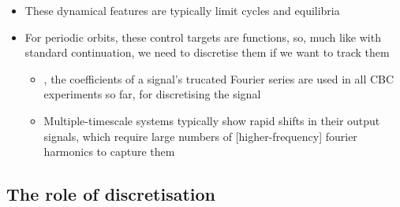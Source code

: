 \documentclass[11pt]{article}
\begin{document}
\begin{itemize}
\item These dynamical features are typically limit cycles and equilibria
\item For periodic orbits, these control targets are functions, so, much like with standard continuation, we need to discretise them if we want to track them
\begin{itemize}
\item{}, the coefficients of a signal's trucated Fourier series are used in all CBC experiments so far, for discretising the signal
\item Multiple-timescale systems typically show rapid shifts in their output signals, which require large numbers of [higher-frequency] fourier harmonics to capture them
\end{itemize}
\end{itemize}


\subsection{The role of discretisation}
\label{sec:orgd38d6f4}
\end{document}
